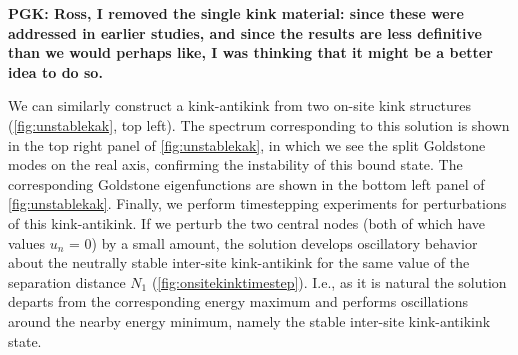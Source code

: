 \documentclass[12pt,reqno]{amsart}
\begin{document}


{\bf PGK: Ross, I removed the single kink
material: since these were addressed in earlier
studies, and since the results are less definitive than
we would perhaps like, I was thinking that it might be
a better idea to do so.}

We can similarly construct a kink-antikink from two on-site kink structures (\cref{fig:unstablekak}, top left). The spectrum corresponding to this solution is shown in the top right panel of \cref{fig:unstablekak}, in which we see the split Goldstone modes on the real axis, confirming the instability of
this bound state. The corresponding Goldstone eigenfunctions are shown in the bottom left panel of \cref{fig:unstablekak}. Finally, we perform timestepping experiments for perturbations of this kink-antikink. If we perturb the two central nodes (both of which have values $u_n$ = 0) by a small amount, the solution develops oscillatory behavior about the neutrally stable inter-site kink-antikink for the same value of the separation distance $N_1$ (\cref{fig:onsitekinktimestep}). I.e., as it is natural
the solution departs from the corresponding energy
maximum and performs oscillations around the nearby
energy minimum, namely the stable inter-site kink-antikink
state.
\end{document}
